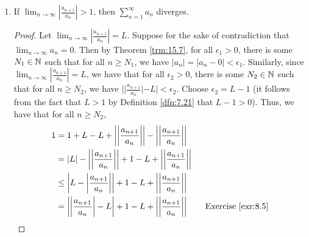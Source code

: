 \documentclass[../main.tex]{subfiles}
\begin{document}
\begin{theorem}
\begin{enumerate}[label={\textup{(}\alph*\textup{)}},ref={\thetheorem\alph*}]
\begin{proof}
\begin{align*}
                &= c_{n+1}
            \end{align*}
            which we may weaken to $|a_{n+1}|\leq|c_{n+1}|$, as desired.\par
            Lastly, we must confirm that $\sum_{n=1}^\infty c_n$ converges. By Script \ref{sct:7}, it follows from the hypothesis that $L<1$ that $1+L<2$, which in turn implies that $\frac{1+L}{2}<1$. Additionally, the above result that $0<\frac{1+L}{2}$ implies by transitivity that $-1<\frac{1+L}{2}$. These last two results when combined imply $\sum_{n=0}^\infty(\frac{1+L}{2})^n$ satisfies the constraints of Theorem \ref{trm:16.7}, meaning that $\sum_{n=0}^\infty(\frac{1+L}{2})^n$ converges. Thus, by Script \ref{sct:0}, $\sum_{n=N_0}^\infty(\frac{1+L}{2})^{n-N_0}$ converges. Consequently, by consecutive applications of Lemma \ref{lem:16.2}, $\sum_{n=1}^\infty(\frac{1+L}{2})^{n-N_0}$ converges. It follows by Theorem \ref{trm:16.8} that $\sum_{n=1}^\infty(\frac{1+L}{2})^{n-N_0}\cdot|a_{N_0}|$ converges. Therefore, by the definition of $c_n$, $\sum_{n=1}^\infty c_n$ converges, as desired.
        \end{proof}
        \item \label{trm:16.15b}If $\lim_{n\to\infty}|\frac{a_{n+1}}{a_n}|>1$, then $\sum_{n=1}^\infty a_n$ diverges.
        \begin{proof}
            Let $\lim_{n\to\infty}|\frac{a_{n+1}}{a_n}|=L$. Suppose for the sake of contradiction that $\lim_{n\to\infty}a_n=0$. Then by Theorem \ref{trm:15.7}, for all $\epsilon_1>0$, there is some $N_1\in\mathbb{N}$ such that for all $n\geq N_1$, we have $|a_n|=|a_n-0|<\epsilon_1$. Similarly, since $\lim_{n\to\infty}|\frac{a_{n+1}}{a_n}|=L$, we have that for all $\epsilon_2>0$, there is some $N_2\in\mathbb{N}$ such that for all $n\geq N_2$, we have $||\frac{a_{n+1}}{a_n}|-L|<\epsilon_2$. Choose $\epsilon_2=L-1$ (it follows from the fact that $L>1$ by Definition \ref{dfn:7.21} that $L-1>0$). Thus, we have that for all $n\geq N_2$,
            \begin{align*}
                1 &= 1+L-L+\left| \left| \frac{a_{n+1}}{a_n} \right| \right|-\left| \left| \frac{a_{n+1}}{a_n} \right| \right|\\
                &= |L|-\left| \left| \frac{a_{n+1}}{a_n} \right| \right|+1-L+\left| \left| \frac{a_{n+1}}{a_n} \right| \right|\\
                &\leq \left| L-\left| \frac{a_{n+1}}{a_n} \right| \right|+1-L+\left| \left| \frac{a_{n+1}}{a_n} \right| \right|\\
                &= \left| \left| \frac{a_{n+1}}{a_n} \right|-L \right|+1-L+\left| \left| \frac{a_{n+1}}{a_n} \right| \right|\tag*{Exercise \ref{exr:8.5}}\\

\end{align*}
\end{proof}
\end{enumerate}
\end{theorem}
\end{document}
